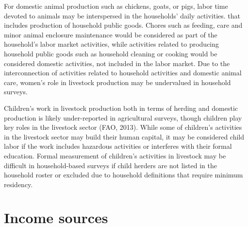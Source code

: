 \documentclass[
]{book}
\begin{document}
For domestic animal production such as chickens, goats, or pigs, labor time devoted to animals may be interspersed in the households' daily activities. that includes production of household public goods. Chores such as feeding, care and minor animal enclosure maintenance would be considered as part of the household's labor market activities, while activities related to producing household public goods such as household cleaning or cooking would be considered domestic activities, not included in the labor market. Due to the interconnection of activities related to household activities and domestic animal care, women's role in livestock production may be undervalued in household surveys.

Children's work in livestock production both in terms of herding and domestic production is likely under-reported in agricultural surveys, though children play key roles in the livestock sector (FAO, 2013). While some of children's activities in the livestock sector may build their human capital, it may be considered child labor if the work includes hazardous activities or interferes with their formal education. Formal measurement of children's activities in livestock may be difficult in household-based surveys if child herders are not listed in the household roster or excluded due to household definitions that require minimum residency.

\hypertarget{income-sources}{%
\section{Income sources}\label{income-sources}}
\end{document}
